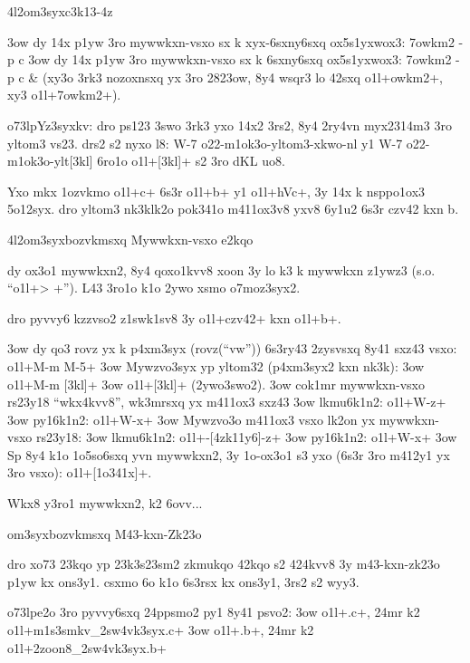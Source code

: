 \24l2om3syx{c3k13-4z}

\s3ow dy 14x p1yw 3ro mywwkxn-vsxo sx k xyx-6sxny6sxq ox5s1yxwox3:
  7owkm2 -p c
\s3ow dy 14x p1yw 3ro mywwkxn-vsxo sx k 6sxny6sxq ox5s1yxwox3:
  7owkm2 -p c &
(xy3o 3rk3 nozoxnsxq yx 3ro 2823ow, 8y4 wsqr3 lo 42sxq \5o1l+owkm2+,
xy3 \5o1l+7owkm2+).

\3o73lp{Yz3syxkv: } dro ps123 3swo 3rk3 yxo 14x2 3rs2, 8y4 2ry4vn
myx2314m3 3ro yltom3 vs23.  drs2 s2 nyxo l8:
      W-7 o22-m1ok3o-yltom3-xkwo-nl
y1
      W-7 o22-m1ok3o-ylt[3kl]
6ro1o \5o1l+[3kl]+ s2 3ro dKL uo8.

Yxo mkx 1ozvkmo \5o1l+c+ 6s3r \5o1l+b+ y1 \5o1l+hVc+, 3y 14x k
nsppo1ox3 5o12syx.  dro yltom3 nk3klk2o pok341o m411ox3v8 yxv8 6y1u2
6s3r czv42 kxn b.

\24l2om3syx{bozvkmsxq Mywwkxn-vsxo e2kqo}

dy ox3o1 mywwkxn2, 8y4 qoxo1kvv8 xoon 3y lo k3 k mywwkxn z1ywz3 (s.o.
``\5o1l+> +'').  L43 3ro1o k1o 2ywo xsmo o7moz3syx2.

dro pyvvy6 kzzvso2 z1swk1sv8 3y \5o1l+czv42+ kxn \5o1l+b+.

\s3ow dy qo3 rovz yx k p4xm3syx (rovz(``vw'')) 6s3ry43 2zysvsxq 8y41
  sxz43 vsxo: \5o1l+M-m M-5+
\s3ow Mywzvo3syx yp yltom32 (p4xm3syx2 kxn nk3k): 
  \s3ow \5o1l+M-m [3kl]+ 
  \s3ow \5o1l+[3kl]+ (2ywo3swo2).
\s3ow cok1mr mywwkxn-vsxo rs23y18 ``wkx4kvv8'', wk3mrsxq yx m411ox3 sxz43
  \s3ow lkmu6k1n2: \5o1l+W-z+
  \s3ow py16k1n2:  \5o1l+W-x+
\s3ow Mywzvo3o m411ox3 vsxo lk2on yx mywwkxn-vsxo rs23y18:
  \s3ow lkmu6k1n2: \5o1l+\M-[4zk11y6]-z+
  \s3ow py16k1n2:  \5o1l+W-x+
\s3ow Sp 8y4 k1o 1o5so6sxq yvn mywwkxn2, 3y 1o-ox3o1 s3 yxo (6s3r 3ro
  m412y1 yx 3ro vsxo): \5o1l+[1o341x]+.  

Wkx8 y3ro1 mywwkxn2, k2 6ovv...

\2om3syx{bozvkmsxq M43-kxn-Zk23o}

dro xo73 23kqo yp 23k3s23sm2 zkmukqo 42kqo s2 424kvv8 3y m43-kxn-zk23o
p1yw kx ons3y1.  csxmo 6o k1o 6s3rsx kx ons3y1, 3rs2 s2 wyy3.

\3o73lp{e2o 3ro pyvvy6sxq 24ppsmo2 py1 8y41 psvo2:}
\s3ow \5o1l+.c+, 24mr k2 \5o1l+m1s3smkv_2sw4vk3syx.c+
\s3ow \5o1l+.b+, 24mr k2 \5o1l+2zoon8_2sw4vk3syx.b+

